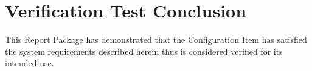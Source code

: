 \newpage
\section{Verification Test Conclusion}
This Report Package has demonstrated that the Configuration Item has satisfied
the system requirements described herein thus is considered verified for its
intended use.
